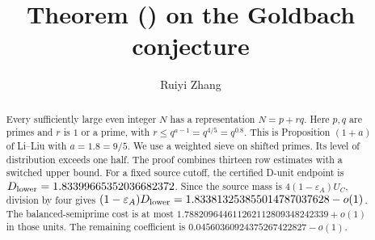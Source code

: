 \documentclass{amsart}
\title{Theorem (\GoldbachTitlePhrase) on the Goldbach conjecture}
\author{Ruiyi Zhang}
\numberwithin{equation}{section}
\numberwithin{table}{section}
\theoremstyle{definition}
\begin{document}
\begin{abstract}
Every sufficiently large even
integer $N$ has a representation $N=p+rq$.
Here $p,q$ are primes and $r$ is $1$ or a prime,
with $r\le q^{a-1}=q^{4/5}=q^{0.8}$. This is Proposition $(1+a)$ of Li--Liu with
$a=1.8=9/5$. We use a weighted sieve on shifted primes.
Its level of distribution exceeds one half. The proof combines
thirteen row estimates with a switched upper bound. For a fixed source
cutoff, the certified D-unit endpoint is
$D_{\rm lower}=1.83399665352036682372$. Since the source mass is
$4(1-\varepsilon_A)U_C$, division by four gives
$(1-\varepsilon_A)D_{\rm lower}=1.833813253855014787037628-o(1)$.
The balanced-semiprime cost is at most
$1.788209644611262112809348242339+o(1)$ in those units. The remaining
coefficient is
$0.04560360924375267422827-o(1)$.
\end{abstract}
\maketitle
\end{document}
